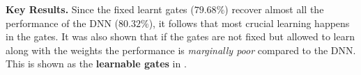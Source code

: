 \textbf{Key Results.} Since the fixed learnt gates ($79.68\%$) recover almost all the performance of the DNN ($80.32\%$), it follows that most crucial learning happens in the gates. It was also shown that if the gates are not fixed but allowed to learn along with the weights the performance is \emph{marginally poor} compared to the DNN. This is shown as the \textbf{learnable gates} in . 

